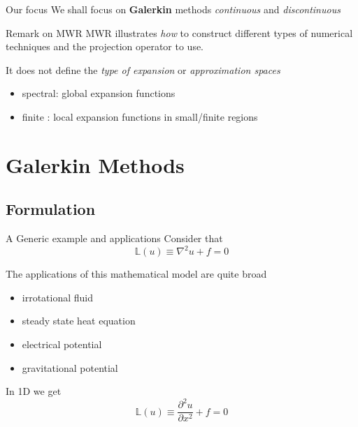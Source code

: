 \begin{frame}{Our focus}
  We shall focus on \textbf{Galerkin} methods \emph{continuous} and \emph{discontinuous}

  \begin{block}{Remark on MWR}
    MWR illustrates \emph{how} to construct different types of
    numerical techniques and the projection operator to use.

    It does not define the \emph{type of expansion} or \emph{approximation spaces}
  \end{block}

  \begin{itemize}
  \item spectral: global expansion functions
  \item finite : local expansion functions in small/finite regions
  \end{itemize}
\end{frame}

\section{Galerkin Methods}
\label{sec:galerkin-methods}

\subsection{Formulation}
\label{sec:formulation-1}

\begin{frame}{A Generic example and applications}
  Consider that
  \begin{equation}
    \label{eq:8}
    \mathbb{L}(u) \equiv \nabla^2 u + f = 0
  \end{equation}


  The applications of this mathematical model are quite broad
  \begin{itemize}
  \item irrotational fluid
  \item steady state heat equation
  \item electrical potential
  \item gravitational potential
  \end{itemize}

In 1D we get
\begin{equation}
  \label{eq:9}
  \mathbb{L}(u) \equiv \frac{\partial^2 u}{\partial x^2} + f = 0
\end{equation}
\end{frame}

